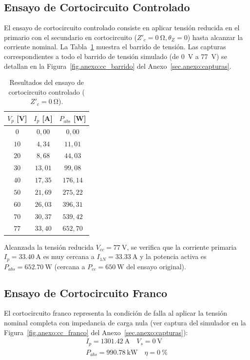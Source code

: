 \subsection{Ensayo de Cortocircuito Controlado}
El ensayo de cortocircuito controlado consiste en aplicar tensión reducida en el primario con el secundario en
cortocircuito ($Z'_c = \SI{0}{\ohm}, \theta_Z = 0$) hasta alcanzar la corriente nominal. La
Tabla~\ref{tab.ej1:resultados_simulador_cc_controlado} muestra el barrido de tensión. Las capturas correspondientes a todo el barrido de tensión simulado (de \SI{0}{\volt} a \SI{77}{\volt}) se detallan en la Figura~\ref{fig.anexo:cc_barrido} del Anexo~\ref{sec.anexo:capturas}.

\begin{table}[!ht]
    \centering
    \caption{Resultados del ensayo de cortocircuito controlado ($Z'_c = \SI{0}{\ohm}$).}
    \label{tab.ej1:resultados_simulador_cc_controlado}
    \begin{tabular}{|c|c|c|}
        \hline
        $V_p$ [\si{\volt}] & $I_p$ [\si{\ampere}] & $P_{abs}$ [\si{\watt}] \\
        \hline
        $0$ & $0,00$ & $0,00$ \\
        $10$ & $4,34$ & $11,01$ \\
        $20$ & $8,68$ & $44,03$ \\
        $30$ & $13,01$ & $99,08$ \\
        $40$ & $17,35$ & $176,14$ \\
        $50$ & $21,69$ & $275,22$ \\
        $60$ & $26,03$ & $396,31$ \\
        $70$ & $30,37$ & $539,42$ \\
        $77$ & $33,40$ & $652,70$ \\
        \hline
    \end{tabular}
\end{table}

Alcanzada la tensión reducida $V_{cc} = \SI{77}{\volt}$, se verifica que la corriente primaria $I_p =
\SI{33,40}{\ampere}$ es muy cercana a $I_{1N} = \SI{33,33}{\ampere}$ y la potencia activa es $P_{abs} =
\SI{652,70}{\watt}$ (cercana a $P_{cc} = \SI{650}{\watt}$ del ensayo original).

\subsection{Ensayo de Cortocircuito Franco}
El cortocircuito franco representa la condición de falla al aplicar la tensión nominal completa con impedancia de carga
nula (ver captura del simulador en la Figura~\ref{fig.anexo:cc_franco} del Anexo~\ref{sec.anexo:capturas}):
\begin{gather*}
    I_p = \SI{1301,42}{\ampere} \quad V_s = \SI{0}{\volt}\\[6pt]
    P_{abs} = \SI{990,78}{\kilo\watt} \quad \eta = \SI{0}{\percent}
\end{gather*}

